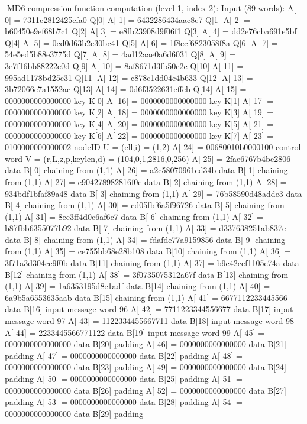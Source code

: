 MD6 compression function computation (level 1, index 2):
Input (89 words):
A[   0] = 7311c2812425cfa0 Q[0]
A[   1] = 6432286434aac8e7 Q[1]
A[   2] = b60450e9ef68b7c1 Q[2]
A[   3] = e8fb23908d9f06f1 Q[3]
A[   4] = dd2e76cba691e5bf Q[4]
A[   5] = 0cd0d63b2c30bc41 Q[5]
A[   6] = 1f8ccf6823058f8a Q[6]
A[   7] = 54e5ed5b88e3775d Q[7]
A[   8] = 4ad12aae0a6d6031 Q[8]
A[   9] = 3e7f16bb88222e0d Q[9]
A[  10] = 8af8671d3fb50c2c Q[10]
A[  11] = 995ad1178bd25c31 Q[11]
A[  12] = c878c1dd04c4b633 Q[12]
A[  13] = 3b72066c7a1552ac Q[13]
A[  14] = 0d6f3522631effcb Q[14]
A[  15] = 0000000000000000 key K[0]
A[  16] = 0000000000000000 key K[1]
A[  17] = 0000000000000000 key K[2]
A[  18] = 0000000000000000 key K[3]
A[  19] = 0000000000000000 key K[4]
A[  20] = 0000000000000000 key K[5]
A[  21] = 0000000000000000 key K[6]
A[  22] = 0000000000000000 key K[7]
A[  23] = 0100000000000002 nodeID U = (ell,i) = (1,2)
A[  24] = 00680010b0000100 control word V = (r,L,z,p,keylen,d) = (104,0,1,2816,0,256)
A[  25] = 2fae6767b4be2806 data B[ 0] chaining from (1,1)
A[  26] = a2c58070961ed34b data B[ 1] chaining from (1,1)
A[  27] = e904278982816f0e data B[ 2] chaining from (1,1)
A[  28] = 934bdf1bfaf89a48 data B[ 3] chaining from (1,1)
A[  29] = 76b58590d48adde3 data B[ 4] chaining from (1,1)
A[  30] = cd05fbf6a5f96726 data B[ 5] chaining from (1,1)
A[  31] = 8ec3ff4d0c6af6c7 data B[ 6] chaining from (1,1)
A[  32] = b87fbb6355077b92 data B[ 7] chaining from (1,1)
A[  33] = d337638251ab837e data B[ 8] chaining from (1,1)
A[  34] = fdafde77a9159856 data B[ 9] chaining from (1,1)
A[  35] = ce755bb68e28b108 data B[10] chaining from (1,1)
A[  36] = 3f71a3d304cc9f0b data B[11] chaining from (1,1)
A[  37] = b9c42ccf1105e74a data B[12] chaining from (1,1)
A[  38] = 3f0735075312a67f data B[13] chaining from (1,1)
A[  39] = 1a6353195d8e1adf data B[14] chaining from (1,1)
A[  40] = 6a9b5a6553635aab data B[15] chaining from (1,1)
A[  41] = 6677112233445566 data B[16] input message word   96
A[  42] = 7711223344556677 data B[17] input message word   97
A[  43] = 1122334455667711 data B[18] input message word   98
A[  44] = 2233445566771122 data B[19] input message word   99
A[  45] = 0000000000000000 data B[20] padding
A[  46] = 0000000000000000 data B[21] padding
A[  47] = 0000000000000000 data B[22] padding
A[  48] = 0000000000000000 data B[23] padding
A[  49] = 0000000000000000 data B[24] padding
A[  50] = 0000000000000000 data B[25] padding
A[  51] = 0000000000000000 data B[26] padding
A[  52] = 0000000000000000 data B[27] padding
A[  53] = 0000000000000000 data B[28] padding
A[  54] = 0000000000000000 data B[29] padding
